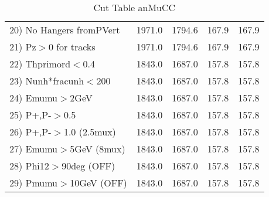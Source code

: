 \begin{table}[h!]
\begin{tabular}{||l||r|r|r|r||}
 20) No Hangers fromPVert &      1971.0 &      1794.6 &       167.9 &       167.9 \\
 21) Pz$>$0 for tracks    &      1971.0 &      1794.6 &       167.9 &       167.9 \\
 22) Thprimord$<$0.4      &      1843.0 &      1687.0 &       157.8 &       157.8 \\
 23) Nunh*fracunh$<$200   &      1843.0 &      1687.0 &       157.8 &       157.8 \\
 24) Emumu$>$2GeV         &      1843.0 &      1687.0 &       157.8 &       157.8 \\
 25) P+,P-$>$0.5          &      1843.0 &      1687.0 &       157.8 &       157.8 \\
 26) P+,P-$>$1.0 (2.5mux) &      1843.0 &      1687.0 &       157.8 &       157.8 \\
 27) Emumu$>$5GeV  (8mux) &      1843.0 &      1687.0 &       157.8 &       157.8 \\
 28) Phi12$>$90deg  (OFF) &      1843.0 &      1687.0 &       157.8 &       157.8 \\
 29) Pmumu$>$10GeV  (OFF) &      1843.0 &      1687.0 &       157.8 &       157.8 \\
 \hline
 \hline
 \end{tabular}
 \caption{Cut Table  anMuCC }
 \label{tab-cut_anmcc}
 \end{table}
